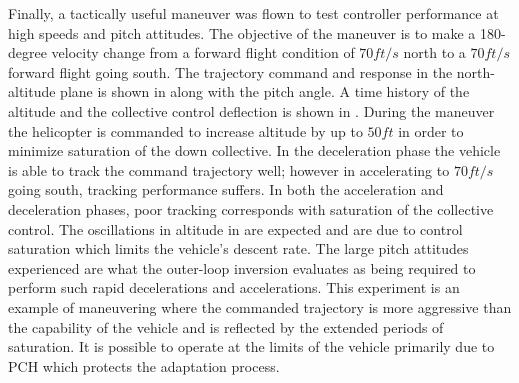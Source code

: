 Finally, a tactically useful maneuver was flown to test controller
performance at high speeds and pitch attitudes. The objective of the
maneuver is to make a 180-degree velocity change from a forward
flight condition of $70 ft/s$ north to a $70 ft/s$ forward flight
going south. The trajectory command and response in the
north-altitude plane is shown in  along with
the pitch angle. A time history of the altitude and the collective
control deflection is shown in . During the
maneuver the helicopter is commanded to increase altitude by up to
$50 ft$ in order to minimize saturation of the down collective. In
the deceleration phase the vehicle is able to track the command
trajectory well; however in accelerating to $70 ft/s$ going south,
tracking performance suffers. In both the acceleration and
deceleration phases, poor tracking corresponds with saturation of
the collective control. The oscillations in altitude in
 are expected and are due to control saturation
which limits the vehicle's descent rate. The large pitch attitudes
experienced are what the outer-loop inversion evaluates as being
required to perform such rapid decelerations and accelerations. This
experiment is an example of maneuvering where the commanded
trajectory is more aggressive than the capability of the vehicle and
is reflected by the extended periods of saturation. It is possible
to operate at the limits of the vehicle primarily due to PCH which
protects the adaptation process.
%
%
%
